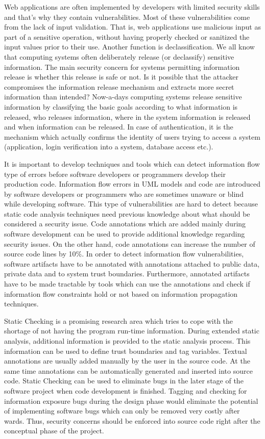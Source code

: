 Web applications are often implemented by developers with limited security skills and that's why they contain vulnerabilities. Most of these vulnerabilities come from the lack of input validation. That is, web applications use malicious input as part of a sensitive operation, without having properly checked or sanitized the input values
prior to their use. Another function is declassification. We all know that computing systems often deliberately release (or declassify) sensitive information. The main security concern for systems permitting information release is whether this release is safe or not. Is it possible that the attacker compromises the information release mechanism and extracts more secret information than intended? Now-a-days computing systems release sensitive information by classifying the basic goals according to what information is released, who releases information, where in the system information is released and when information can be released. In case of authentication, it is the mechanism which actually confirms the identity of users trying to access a system (application, login verification into a system, database access etc.). 

It is important to develop techniques and tools which can detect information flow type of errors before software developers or programmers develop their production code. Information flow errors in UML models and code are introduced by software developers or programmers who are sometimes unaware or blind while developing software. This type of vulnerabilities are hard to detect because static code analysis techniques need previous knowledge about what should be considered a security issue. Code annotations which are added mainly during software development \cite{ref_18_chess2004static} can be used to provide additional knowledge regarding security issues. On the other hand, code annotations can increase the number of source code lines by 10\%. In order to detect information flow vulnerabilities, software artifacts have to be annotated with annotations attached to public data, private data and to system trust boundaries. Furthermore, annotated artifacts have to be made tractable by tools which can use the annotations and check if information flow constraints hold or not based on information propagation techniques.

Static Checking is a promising research area which tries to cope with the shortage of not having the program run-time information. During extended static analysis, additional information is provided to the static analysis process. This information can be used to define trust boundaries and tag variables. Textual annotations are usually added manually by the user in the source code. At the same time annotations can be automatically generated and inserted into source code. Static Checking can be used to eliminate bugs in the later stage of the software project when code development is finished. Tagging and checking for information exposure bugs during the design phase would eliminate the potential of implementing software bugs which can only be removed very costly after wards. Thus, security concerns should be enforced into source code right after the conceptual phase of the project.


